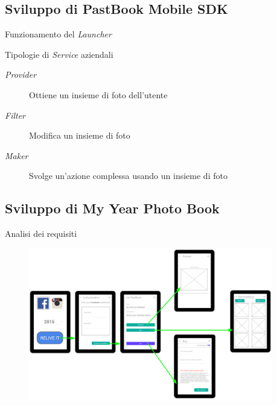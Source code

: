 	\subsection{Sviluppo di PastBook Mobile SDK}
		\begin{frame}{Funzionamento del \emph{Launcher}}
			\fontsize{8pt}{7}\selectfont
			\begin{block}{Tipologie di \emph{Service} aziendali}
				\begin{description}
					\item[\emph{Provider}] Ottiene un insieme di foto dell'utente
					\item[\emph{Filter}] Modifica un insieme di foto
					\item[\emph{Maker}] Svolge un'azione complessa usando un insieme di foto	
				\end{description}
			\end{block}
			
		\end{frame}
	\subsection{Sviluppo di My Year Photo Book}
		\begin{frame}{Analisi dei requisiti}
			\begin{figure}[H]
				\centering
				\includegraphics[width=0.95\textwidth]{capitolo_3/immagini/wireframe.png}
			\end{figure}
		\end{frame}
